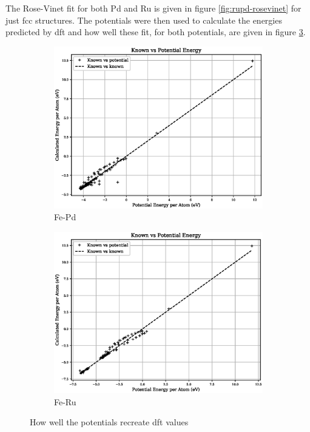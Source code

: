 The Rose-Vinet fit for both Pd and Ru is given in figure \ref{fig:rupd-rosevinet} for just \acrshort{fcc} structures.  The potentials were then used to calculate the energies predicted by \acrshort{dft} and how well these fit, for both potentials, are given in figure \ref{fig:fepd-feru-fit}.

\begin{figure}[htb]
\begin{subfigure}{.48\textwidth}
  \centering
  \includegraphics[width=.94\linewidth]{chapters/potentials_fe_pd_ru/fepd_potential/potential_known_energy_full_set.eps} 
  \caption{Fe-Pd}
  \label{fig:fepd-fit}
\end{subfigure}
\begin{subfigure}{.48\textwidth}
  \centering
  \includegraphics[width=.94\linewidth]{chapters/potentials_fe_pd_ru/feru_potential/potential_known_energy_full_set.eps} 
  \caption{Fe-Ru}
  \label{fig:feru-fit}
\end{subfigure}
\label{fig:fepd-feru-fit}
\caption{How well the potentials recreate \acrshort{dft} values}
\end{figure}

